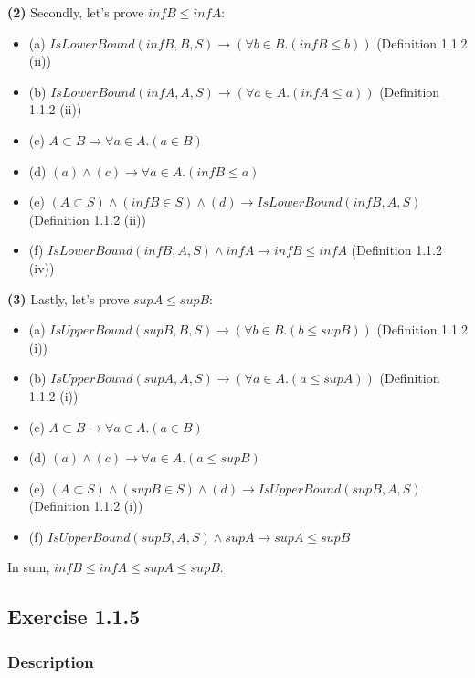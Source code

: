 \documentclass[12pt, letterpaper, oneside]{book}
\begin{document}
\textbf{(2)} Secondly, let's prove $inf B \le inf A$:
\begin{itemize}
  \item (a) $IsLowerBound(inf B, B, S) \rightarrow (\forall b \in B. (inf B \le b))$ (Definition 1.1.2 (ii))
  \item (b) $IsLowerBound(inf A, A, S) \rightarrow (\forall a \in A. (inf A \le a))$ (Definition 1.1.2 (ii))
  \item (c) $A \subset B \rightarrow \forall a \in A. (a \in B)$
  \item (d) $(a) \land (c) \rightarrow \forall a \in A. (inf B \le a)$
  \item (e) $(A \subset S) \land (inf B \in S) \land (d) \rightarrow IsLowerBound(inf B, A, S)$ (Definition 1.1.2 (ii))
  \item (f) $IsLowerBound(inf B, A, S) \land inf A \rightarrow inf B \le inf A$ (Definition 1.1.2 (iv))
\end{itemize}

\textbf{(3)} Lastly, let's prove $sup A \le sup B$:
\begin{itemize}
  \item (a) $IsUpperBound(sup B, B, S) \rightarrow (\forall b \in B. (b \le sup B))$ (Definition 1.1.2 (i))
  \item (b) $IsUpperBound(sup A, A, S) \rightarrow (\forall a \in A. (a \le sup A))$ (Definition 1.1.2 (i))
  \item (c) $A \subset B \rightarrow \forall a \in A. (a \in B)$
  \item (d) $(a) \land (c) \rightarrow \forall a \in A. (a \le sup B)$
  \item (e) $(A \subset S) \land (sup B \in S) \land (d) \rightarrow IsUpperBound(sup B, A, S)$ (Definition 1.1.2 (i))
  \item (f) $IsUpperBound(sup B, A, S) \land sup A \rightarrow sup A \le sup B$
\end{itemize}

In sum, $inf B \le inf A \le sup A \le sup B$.

\subsection{Exercise 1.1.5}

\subsubsection{Description}
\end{document}
